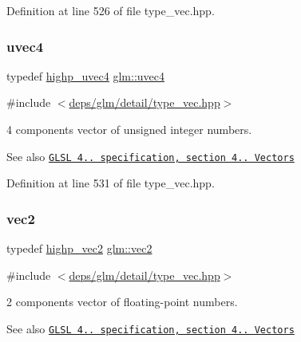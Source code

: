 Definition at line 526 of file type\+\_\+vec.\+hpp.

\mbox{\label{group__core__types_ga1c426d19627b32b14f0089f7f4ba7b1d}} 
\subsubsection{\texorpdfstring{uvec4}{uvec4}}
{\footnotesize\ttfamily typedef \hyperlink{group__core__precision_gae48d6e9a99afc33e6fa51e5d576dfd1a}{highp\+\_\+uvec4} \hyperlink{group__core__types_ga1c426d19627b32b14f0089f7f4ba7b1d}{glm\+::uvec4}}



{\ttfamily \#include $<$\hyperlink{type__vec_8hpp}{deps/glm/detail/type\+\_\+vec.\+hpp}$>$}

4 components vector of unsigned integer numbers.

\begin{DoxySeeAlso}{See also}
\href{http://www.opengl.org/registry/doc/GLSLangSpec.4.20.8.pdf}{\tt G\+L\+SL 4.. specification, section 4.. Vectors} 
\end{DoxySeeAlso}


Definition at line 531 of file type\+\_\+vec.\+hpp.

\mbox{\label{group__core__types_gaa1618f51db67eaa145db101d8c8431d8}} 
\subsubsection{\texorpdfstring{vec2}{vec2}}
{\footnotesize\ttfamily typedef \hyperlink{group__core__precision_gad588ab946806864499d6559c186ce3ba}{highp\+\_\+vec2} \hyperlink{group__core__types_gaa1618f51db67eaa145db101d8c8431d8}{glm\+::vec2}}



{\ttfamily \#include $<$\hyperlink{type__vec_8hpp}{deps/glm/detail/type\+\_\+vec.\+hpp}$>$}

2 components vector of floating-\/point numbers.

\begin{DoxySeeAlso}{See also}
\href{http://www.opengl.org/registry/doc/GLSLangSpec.4.20.8.pdf}{\tt G\+L\+SL 4.. specification, section 4.. Vectors} 
\end{DoxySeeAlso}


